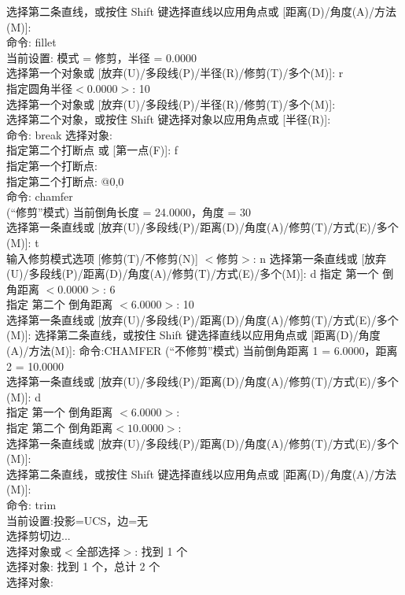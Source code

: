 选择第二条直线，或按住 Shift 键选择直线以应用角点或 [距离(D)/角度(A)/方法(M)]:\\
命令: fillet\\
当前设置: 模式 = 修剪，半径 = 0.0000\\
选择第一个对象或 [放弃(U)/多段线(P)/半径(R)/修剪(T)/多个(M)]: r \\
指定圆角半径$<$0.0000$>$: 10\\
选择第一个对象或 [放弃(U)/多段线(P)/半径(R)/修剪(T)/多个(M)]:\\
选择第二个对象，或按住 Shift 键选择对象以应用角点或 [半径(R)]:\\
命令: break 选择对象:\\
指定第二个打断点 或 [第一点(F)]: f\\
指定第一个打断点:\\
指定第二个打断点: @0,0\\
命令: chamfer\\
(“修剪”模式) 当前倒角长度 = 24.0000，角度 = 30\\
选择第一条直线或 [放弃(U)/多段线(P)/距离(D)/角度(A)/修剪(T)/方式(E)/多个(M)]:  t\\
输入修剪模式选项 [修剪(T)/不修剪(N)] $<$修剪$>$: n
选择第一条直线或 [放弃(U)/多段线(P)/距离(D)/角度(A)/修剪(T)/方式(E)/多个(M)]:  d 指定 第一个 倒角距离 $<0.0000>$: 6\\
 指定 第二个 倒角距离 $<6.0000>$: 10\\
选择第一条直线或 [放弃(U)/多段线(P)/距离(D)/角度(A)/修剪(T)/方式(E)/多个(M)]:
选择第二条直线，或按住 Shift 键选择直线以应用角点或 [距离(D)/角度(A)/方法(M)]:
命令:CHAMFER
(“不修剪”模式) 当前倒角距离 1 = 6.0000，距离 2 = 10.0000\\
选择第一条直线或 [放弃(U)/多段线(P)/距离(D)/角度(A)/修剪(T)/方式(E)/多个(M)]:  d \\
指定 第一个 倒角距离 $<6.0000>$: \\
指定 第二个 倒角距离$<10.0000>$:\\
选择第一条直线或 [放弃(U)/多段线(P)/距离(D)/角度(A)/修剪(T)/方式(E)/多个(M)]:\\
选择第二条直线，或按住 Shift 键选择直线以应用角点或 [距离(D)/角度(A)/方法(M)]:\\
命令: trim\\
当前设置:投影=UCS，边=无\\
选择剪切边...\\
选择对象或$<$全部选择$>$:  找到 1 个\\
选择对象: 找到 1 个，总计 2 个\\
选择对象:\\
